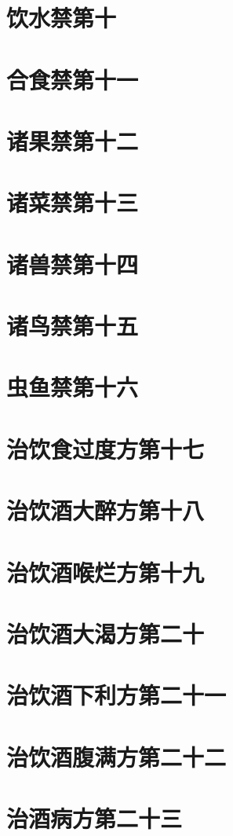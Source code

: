 \documentclass[a4paper,12pt,UTF8,twoside]{ctexbook}
\begin{document}
\chapter{饮水禁第十}
\chapter{合食禁第十一}
\chapter{诸果禁第十二}
\chapter{诸菜禁第十三}
\chapter{诸兽禁第十四}
\chapter{诸鸟禁第十五}
\chapter{虫鱼禁第十六}
\chapter{治饮食过度方第十七}
\chapter{治饮酒大醉方第十八}
\chapter{治饮酒喉烂方第十九}
\chapter{治饮酒大渴方第二十}
\chapter{治饮酒下利方第二十一}
\chapter{治饮酒腹满方第二十二}
\chapter{治酒病方第二十三}
\end{document}
